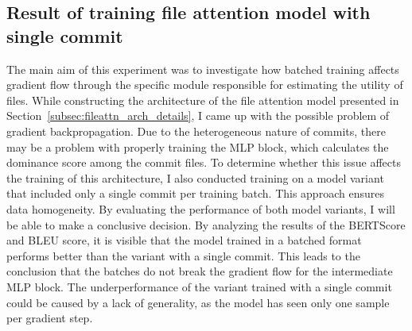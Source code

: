 \subsection{Result of training file attention model with single commit}
The main aim of this experiment was to investigate how batched training affects gradient flow through the specific module responsible for estimating the utility of files. While constructing the architecture of the file attention model presented in Section~\ref{subsec:fileattn_arch_details}, I came up with the possible problem of gradient backpropagation. Due to the heterogeneous nature of commits, there may be a problem with properly training the MLP block, which calculates the dominance score among the commit files.
To determine whether this issue affects the training of this architecture, I also conducted training on a model variant that included only a single commit per training batch. This approach ensures data homogeneity. By evaluating the performance of both model variants, I will be able to make a conclusive decision. By analyzing the results of the BERTScore and BLEU score, it is visible that the model trained in a batched format performs better than the variant with a single commit. This leads to the conclusion that the batches do not break the gradient flow for the intermediate MLP block. The underperformance of the variant trained with a single commit could be caused by a lack of generality, as the model has seen only one sample per gradient step.

